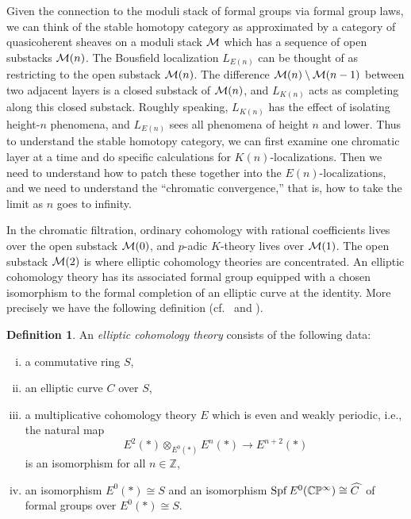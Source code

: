 \documentclass{gtpart}
\theoremstyle{definition}
\newtheorem{defn}[thm]{Definition}
\theoremstyle{remark}
\newcommand{\mb}[1]{\mathbb{#1}}
\newcommand{\Spf}{{\rm Spf\thinspace}}
\newcommand{\CM}{{\cal M}}
\newcommand{\BC}{{\mb C}}
\newcommand{\BP}{{\mb P}}
\newcommand{\BZ}{{\mb Z}}
\newcommand{\HC}{\widehat{C~}\!}
\numberwithin{equation}{section}
\numberwithin{thm}{section}
\begin{document}
Given the connection to the moduli stack of formal groups via formal 
group laws, we can think of the stable homotopy category as approximated 
by a category of quasicoherent sheaves on a moduli stack $\CM$ which has 
a sequence of open substacks $\CM(n)$.  The Bousfield localization 
$L_{E(n)}$ can be thought of as restricting to the open substack 
$\CM(n)$.  The difference $\CM(n) \setminus \CM(n-1)$ between two 
adjacent layers is a closed substack of $\CM(n)$, and $L_{K(n)}$ acts as 
completing along this closed substack.  Roughly speaking, $L_{K(n)}$ has 
the effect of isolating height-$n$ phenomena, and $L_{E(n)}$ sees all 
phenomena of height $n$ and lower.  Thus to understand the stable 
homotopy category, we can first examine one chromatic layer at a time 
and do specific calculations for $K(n)$-localizations.  Then we need to 
understand how to patch these together into the $E(n)$-localizations, 
and we need to understand the ``chromatic convergence,'' that is, how 
to take the limit as $n$ goes to infinity.  

In the chromatic filtration, ordinary cohomology with rational 
coefficients lives over the open substack $\CM(0)$, and $p$-adic 
$K$-theory lives over $\CM(1)$.  The open substack $\CM(2)$ is where 
elliptic cohomology theories are concentrated.  An elliptic cohomology 
theory has its associated formal group equipped with a chosen 
isomorphism to the formal completion of an elliptic curve at the 
identity.  More precisely we have the following definition 
(cf.~\cite[Definition 1.2]{AHS01} and \cite[Definition 1.2]{survey}).  

\begin{defn}
 An {\em elliptic cohomology theory} consists of the following data: 
 \begin{enumerate}[(i)]
  \item a commutative ring $S$, 

  \item an elliptic curve $C$ over $S$, 

  \item a multiplicative cohomology theory $E$ which is even and weakly 
  periodic, i.e., the natural map 
  \[
   E^2(*) \otimes_{E^0(*)} E^n(*) \longrightarrow E^{n+2}(*) 
  \]
  is an isomorphism for all $n \in \BZ$, 

  \item an isomorphism $E^0(*) \cong S$ and an isomorphism 
  $\Spf E^0(\BC\BP^\infty) \cong \HC$ of formal groups over 
  $E^0(*) \cong S$.  
 \end{enumerate}
\end{defn}
\end{document}
